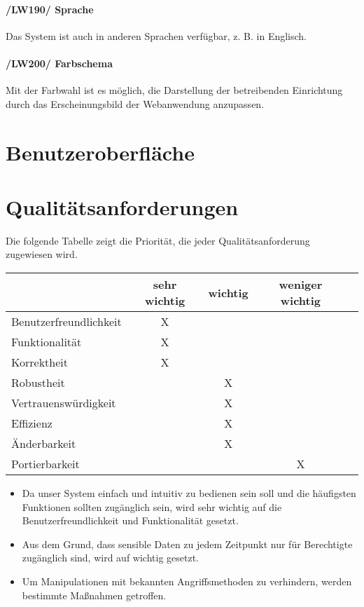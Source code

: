 \documentclass{article}
\begin{document}
	    \paragraph{/LW190/ \label{LW190} Sprache}
	    Das System ist auch in anderen Sprachen verfügbar, z. B. in Englisch.
	    
\paragraph{/LW200/ \label{LW210} Farbschema}	    	       
	       Mit der Farbwahl ist es möglich, die Darstellung der betreibenden Einrichtung durch das Erscheinungsbild der Webanwendung anzupassen.


\newpage

\section{Benutzeroberfläche}

\newpage

\section{Qualitätsanforderungen}

Die folgende Tabelle zeigt die Priorität, die jeder Qualitätsanforderung zugewiesen wird.
	
\begin{center}
\begin{tabular}{ |l||c|c|c|c| } 
 \hline
  & sehr wichtig & wichtig & weniger wichtig &\\
 \hline\hline
 Benutzerfreundlichkeit & X & & & \\
 \hline
 Funktionalität & X & & & \\ 
 \hline
 Korrektheit & X & & & \\
 \hline
 Robustheit & & X & & \\
 \hline
 Vertrauenswürdigkeit & & X & & \\
 \hline
 Effizienz & & X & & \\
 \hline
 Änderbarkeit & & X & & \\
 \hline
 Portierbarkeit & &   & X & \\

 \hline
\end{tabular}
\end{center}
\begin{itemize}
\item Da  unser System einfach und intuitiv zu bedienen sein soll und die häufigsten Funktionen sollten
 zugänglich sein, wird sehr wichtig  auf die Benutzerfreundlichkeit und Funktionalität gesetzt.
\item Aus dem Grund, dass sensible Daten zu jedem Zeitpunkt nur für Berechtigte zugänglich sind, wird auf  wichtig gesetzt.
\item Um Manipulationen mit bekannten Angriffsmethoden zu verhindern, werden bestimmte Maßnahmen getroffen.
\end{itemize}
\end{document}

